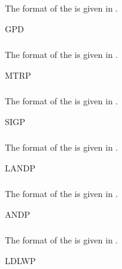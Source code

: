 \subsubsection{}\label{sec:GPDBlock}
The format of the  is given in .
\begin{BlockTable}{GPD}
  \label{tab:GPDBlock}
\end{BlockTable}

\subsubsection{}\label{sec:MTRPBlock}
The format of the  is given in .
\begin{BlockTable}{MTRP}
  \label{tab:MTRPBlock}
\end{BlockTable}

\subsubsection{}\label{sec:SIGPBlock}
The format of the  is given in .
\begin{BlockTable}{SIGP}
  \label{tab:SIGPBlock}
\end{BlockTable}

\subsubsection{}\label{sec:LANDPBlock}
The format of the  is given in .
\begin{BlockTable}{LANDP}
  \label{tab:LANDPBlock}
\end{BlockTable}

\subsubsection{}\label{sec:ANDPBlock}
The format of the  is given in .
\begin{BlockTable}{ANDP}
  \label{tab:ANDPBlock}
\end{BlockTable}

\subsubsection{}\label{sec:LDLWPBlock}
The format of the  is given in .
\begin{BlockTable}{LDLWP}
  \label{tab:LDLWPBlock}
\end{BlockTable}

